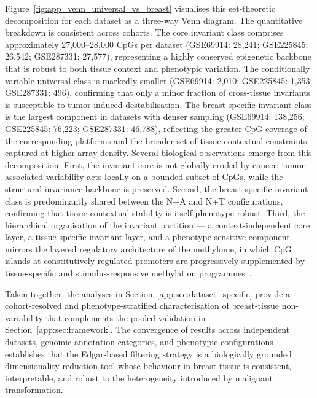 Figure~\ref{fig:app_venn_universal_vs_breast} visualises this 
set-theoretic decomposition for each dataset as a three-way 
Venn diagram. The quantitative breakdown is consistent across 
cohorts. The core invariant class comprises approximately 
27,000–28,000 CpGs per dataset (GSE69914: 28{,}241; 
GSE225845: 26{,}542; GSE287331: 27{,}577), representing a highly 
conserved epigenetic backbone that is robust to both tissue 
context and phenotypic variation. The conditionally variable 
universal class is markedly smaller (GSE69914: 2{,}010; 
GSE225845: 1{,}353; GSE287331: 496), confirming that only a 
minor fraction of cross-tissue invariants is susceptible to 
tumor-induced destabilisation. The breast-specific invariant 
class is the largest component in datasets with denser sampling 
(GSE69914: 138{,}256; GSE225845: 76{,}223; GSE287331: 46{,}788), reflecting the greater 
CpG coverage of the corresponding platforms and the broader set 
of tissue-contextual constraints captured at higher array density.
Several biological observations emerge from this decomposition. 
First, the invariant core is not globally eroded by cancer: 
tumor-associated variability acts locally on a bounded subset of 
CpGs, while the structural invariance backbone is preserved. 
Second, the breast-specific invariant class is predominantly 
shared between the N+A and N+T configurations, confirming that 
tissue-contextual stability is itself phenotype-robust. Third, 
the hierarchical organisation of the invariant partition — a 
context-independent core layer, a tissue-specific invariant 
layer, and a phenotype-sensitive component — mirrors the layered 
regulatory architecture of the methylome, in which CpG islands 
at constitutively regulated promoters are progressively 
supplemented by tissue-specific and stimulus-responsive 
methylation programmes~\cite{Edgar2017,Bock2012}.

Taken together, the analyses in 
Section~\ref{app:sec:dataset_specific} provide a 
cohort-resolved and phenotype-stratified characterisation of 
breast-tissue non-variability that complements the pooled 
validation in Section~\ref{app:sec:framework}. The convergence 
of results across independent datasets, genomic annotation 
categories, and phenotypic configurations establishes that the 
Edgar-based filtering strategy is a biologically grounded 
dimensionality reduction tool whose behaviour in breast tissue 
is consistent, interpretable, and robust to the heterogeneity 
introduced by malignant transformation.


